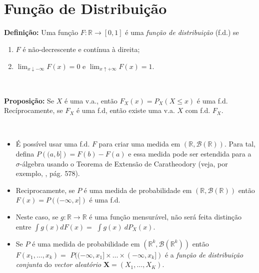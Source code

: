 \documentclass[
]{book}
\providecommand{\tightlist}{%
  \setlength{\itemsep}{0pt}\setlength{\parskip}{0pt}}
\begin{document}
\(~\)

\(~\)

\hypertarget{funuxe7uxe3o-de-distribuiuxe7uxe3o}{%
\section{Função de Distribuição}\label{funuxe7uxe3o-de-distribuiuxe7uxe3o}}

\textbf{Definição:} Uma função \(F: \mathbb{R} \longrightarrow [0,1]\) é uma \emph{função de distribuição} (f.d.) se

\begin{enumerate}
\def\labelenumi{(\roman{enumi})}
\tightlist
\item
  \(F\) é não-decrescente e contínua à direita;
\item
  \(\displaystyle\lim_{x\downarrow-\infty}F(x)=0\) e \(\displaystyle\lim_{x\uparrow+\infty}F(x)=1\).
\end{enumerate}

\(~\)

\textbf{Proposição:} Se \(X\) é uma v.a., então \(F_X(x)=P_X(X\leq x)\) é uma f.d. Recíprocamente, se \(F_X\) é uma f.d, então existe uma v.a. \(X\) com f.d. \(F_X\).

\(~\)

\begin{itemize}
\item
  É possível usar uma f.d. \(F\) para criar uma medida em \((\mathbb{R},\mathcal{B}(\mathbb{R}))\). Para tal, defina \(P\left((a,b]\right)=F(b)-F(a)\) e essa medida pode ser estendida para a \(\sigma\)-álgebra usando o Teorema de Extensão de Caratheodory (veja, por exemplo, \citet{Schervish12}, pág. 578).
\item
  Reciprocamente, se \(P\) é uma medida de probabilidade em \((\mathbb{R},\mathcal{B}(\mathbb{R}))\) então \(F(x)=P\left((-\infty,x]\right)\) é uma f.d.
\item
  Neste caso, se \(g: \mathbb{R}\longrightarrow \mathbb{R}\) é uma função mensurável, não será feita distinção entre \(\displaystyle\int g(x)dF(x)=\) \(\displaystyle\int g(x)~dP_X(x)\).
\item
  Se \(P\) é uma medida de probabilidade em \((\mathbb{R}^k,\mathcal{B}(\mathbb{R}^k))\) então \(F(x_1,\ldots,x_k)=\) \(P((-\infty,x_1]\times \ldots\times (-\infty,x_k])\) é a \emph{função de distribuição conjunta} do \emph{vector aleatório} \(\boldsymbol{X} = (X_1,\ldots,X_K)\).
\end{itemize}

\(~\)
\end{document}
